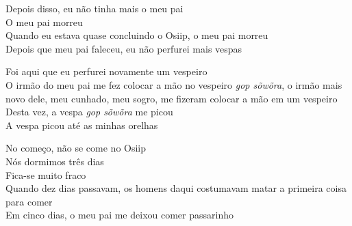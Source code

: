 \bigskip

\begin{linenumbers}\begingroup\raggedright
 
\noindent   Depois disso, eu não tinha mais o meu pai\\
  O meu pai morreu\\
  Quando eu estava quase concluindo o Osiip, o meu pai morreu\\
  Depois que meu pai faleceu, eu não perfurei mais vespas
 
\end{linenumbers}\endgroup

\bigskip

\begin{linenumbers}\begingroup\raggedright
 
\noindent   Foi aqui que eu perfurei novamente um vespeiro\\
  O irmão do meu pai me fez colocar a mão no vespeiro \emph{gop sõwõra}, o irmão mais novo dele, meu cunhado, meu sogro, me fizeram colocar a mão em um vespeiro \\
  Desta vez, a vespa \emph{gop sõwõra} me picou\\
  A vespa picou até as minhas orelhas
 
\end{linenumbers}\endgroup

\bigskip

\begin{linenumbers}\begingroup\raggedright
 
\noindent   No começo, não se come no Osiip\\
  Nós dormimos três dias\\
  Fica-se muito fraco\\
  Quando dez dias passavam, os homens daqui costumavam matar a primeira coisa para comer\\
  Em cinco dias, o meu pai me deixou comer passarinho
 
\end{linenumbers}\endgroup

